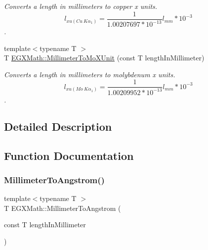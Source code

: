 \begin{DoxyCompactItemize}
\begin{DoxyCompactList}\small\item\em Converts a length in millimeters to copper x units. \[ l_{xu(Cu\ K\alpha_1)}= \frac{1}{1.00207697*10^{-13}} l_{mm} * 10^{-3}\]. \end{DoxyCompactList}\item 
{\footnotesize template$<$typename T $>$ }\\T \mbox{\hyperlink{group___e_g_x_math-_conversions-_length_conversions-_s_i-_millimeter-_non-_s_i_ga1f0be98bc702f46a69579b27e05a2439}{E\+G\+X\+Math\+::\+Millimeter\+To\+Mo\+X\+Unit}} (const T length\+In\+Millimeter)
\begin{DoxyCompactList}\small\item\em Converts a length in millimeters to molybdenum x units. \[ l_{xu(Mo\ K\alpha_1)}=\frac{1}{1.00209952*10^{-13}} l_{mm} * 10^{-3}\]. \end{DoxyCompactList}\end{DoxyCompactItemize}


\subsection{Detailed Description}


\subsection{Function Documentation}
\mbox{\label{group___e_g_x_math-_conversions-_length_conversions-_s_i-_millimeter-_non-_s_i_ga40e4659f4689e5be54f8e28fd8ce0008}} 
\subsubsection{\texorpdfstring{Millimeter\+To\+Angstrom()}{MillimeterToAngstrom()}}
{\footnotesize\ttfamily template$<$typename T $>$ \\
T E\+G\+X\+Math\+::\+Millimeter\+To\+Angstrom (\begin{DoxyParamCaption}\item[{const T}]{length\+In\+Millimeter }\end{DoxyParamCaption})}



